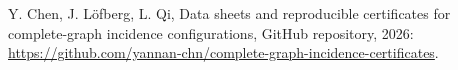 Y. Chen, J. L\"ofberg, L. Qi,
Data sheets and reproducible certificates for complete-graph incidence configurations,
GitHub repository, 2026:
\url{https://github.com/yannan-chn/complete-graph-incidence-certificates}.
